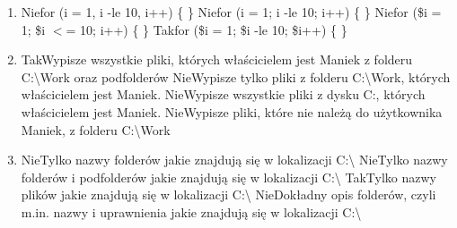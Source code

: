\begin{enumerate}
		\newpage
		\item {}%
		{Nie}{for (i = 1, i -le 10, i++) \{ \}}%
		{Nie}{for (i = 1; i -le 10; i++) \{ \}}%
		{Nie}{for (\$i = 1; \$i $ < $= 10; i++) \{ \}}%
		{Tak}{for (\$i = 1; \$i -le 10; \$i++) \{ \}}
		\item {}%
		{Tak}{Wypisze wszystkie pliki, których właścicielem jest Maniek z folderu C:\textbackslash Work oraz podfolderów}%
		{Nie}{Wypisze tylko pliki z folderu C:\textbackslash Work, których właścicielem jest Maniek.}%
		{Nie}{Wypisze wszystkie pliki z dysku C:, których właścicielem jest Maniek.}%
		{Nie}{Wypisze pliki, które nie należą do użytkownika Maniek, z folderu C:\textbackslash Work}
		\item {}%
		{Nie}{Tylko nazwy folderów jakie znajdują się w lokalizacji C:\textbackslash}%
		{Nie}{Tylko nazwy folderów i podfolderów jakie znajdują się w lokalizacji C:\textbackslash}%
		{Tak}{Tylko nazwy plików jakie znajdują się w lokalizacji C:\textbackslash}%
		{Nie}{Dokładny opis folderów, czyli m.in. nazwy i uprawnienia jakie znajdują się w lokalizacji C:\textbackslash}
		
		
	\end{enumerate}